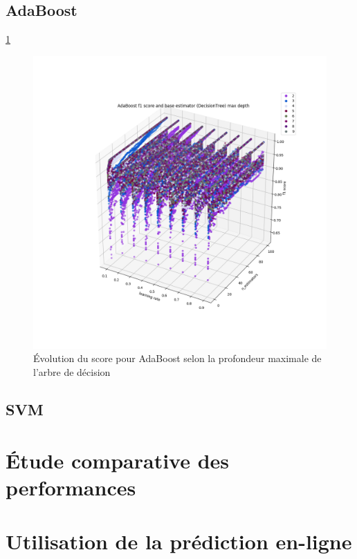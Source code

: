 \documentclass[a4paper]{report}
\begin{document}
\subsection{AdaBoost}

\ref{adaboost_depth}

\begin{figure}
\centering
\includegraphics[width=\textwidth]{img/adaboost_depth.png}
\caption{Évolution du score pour AdaBoost selon la profondeur maximale de l'arbre de décision\label{adaboost_depth}}
\end{figure}

\subsection{SVM}

\section{Étude comparative des performances}

\section{Utilisation de la prédiction en-ligne}

\end{document}
